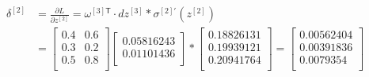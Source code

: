 \documentclass{article}
\begin{document}
\[
    \begin{aligned}
        \delta^{[2]} & = \frac{\partial L}{\partial z^{[2]}} = \omega^{[3]\mathsf{T}}\cdot dz^{[3]}*\sigma^{[2]'}(z^{[2]}) \\
                     & = \begin{bmatrix}
                             0.4 & 0.6 \\
                             0.3 & 0.2 \\
                             0.5 & 0.8 \\
                         \end{bmatrix}
        \begin{bmatrix}
            0.05816243 \\
            0.01101436 \\
        \end{bmatrix}
        * \begin{bmatrix}
              0.18826131 \\
              0.19939121 \\
              0.20941764 \\
          \end{bmatrix}
        = \begin{bmatrix}
              0.00562404 \\
              0.00391836 \\
              0.0079354  \\
          \end{bmatrix}
    \end{aligned}
\]
\end{document}
